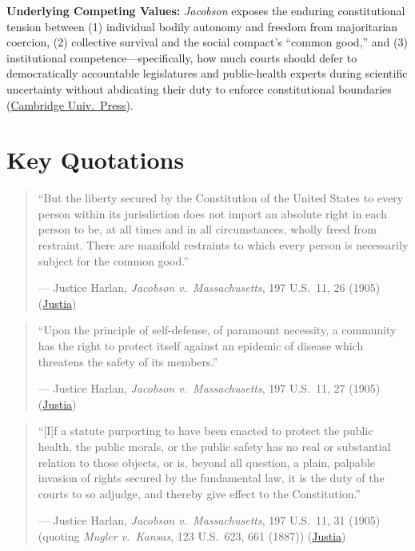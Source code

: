 \documentclass[12pt]{article}
\begin{document}
\textbf{Underlying Competing Values:} \textit{Jacobson} exposes the enduring constitutional tension between (1) individual bodily autonomy and freedom from majoritarian coercion, (2) collective survival and the social compact's ``common good,'' and (3) institutional competence---specifically, how much courts should defer to democratically accountable legislatures and public-health experts during scientific uncertainty without abdicating their duty to enforce constitutional boundaries (\href{https://www.cambridge.org/core/books/covid19-and-the-law/jacobson-question/A463868C48886F30BD127463D9796626}{Cambridge Univ.\ Press}).

\section{Key Quotations}

\begin{quote}
``But the liberty secured by the Constitution of the United States to every person within its jurisdiction does not import an absolute right in each person to be, at all times and in all circumstances, wholly freed from restraint. There are manifold restraints to which every person is necessarily subject for the common good.''
\begin{flushright}--- Justice Harlan, \textit{Jacobson v.\ Massachusetts}, 197 U.S.\ 11, 26 (1905) (\href{https://supreme.justia.com/cases/federal/us/197/11/}{Justia})\end{flushright}
\end{quote}

\begin{quote}
``Upon the principle of self-defense, of paramount necessity, a community has the right to protect itself against an epidemic of disease which threatens the safety of its members.''
\begin{flushright}--- Justice Harlan, \textit{Jacobson v.\ Massachusetts}, 197 U.S.\ 11, 27 (1905) (\href{https://supreme.justia.com/cases/federal/us/197/11/}{Justia})\end{flushright}
\end{quote}

\begin{quote}
``[I]f a statute purporting to have been enacted to protect the public health, the public morals, or the public safety has no real or substantial relation to those objects, or is, beyond all question, a plain, palpable invasion of rights secured by the fundamental law, it is the duty of the courts to so adjudge, and thereby give effect to the Constitution.''
\begin{flushright}--- Justice Harlan, \textit{Jacobson v.\ Massachusetts}, 197 U.S.\ 11, 31 (1905) (quoting \textit{Mugler v.\ Kansas}, 123 U.S.\ 623, 661 (1887)) (\href{https://supreme.justia.com/cases/federal/us/197/11/}{Justia})\end{flushright}
\end{quote}
\end{document}
